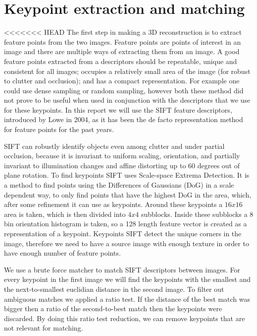 \section{Keypoint extraction and matching}
\label{matching}
<<<<<<< HEAD
The first step in making a 3D reconstruction is to extract feature points from the two images.
Feature points are points of interest in an image and there are multiple ways of extracting them from an image.
A good feature points extracted from a descriptors should be repeatable, unique and consistent for all images;
occupies a relatively small area of the image (for robust to clutter and occlusion); and has a compact representation.
For example one could use dense sampling \cite{DSIFT} or random sampling,
however both these method did not prove to be useful when used in conjunction with the descriptors that we use for these keypoints.
In this report we will use the SIFT feature descriptors, introduced by Lowe\cite{SIFT} in 2004, as it has been the de facto representation method for feature points for the past years.

SIFT can robustly identify objects even among clutter and under partial occlusion, because it is invariant to uniform scaling, orientation, and partially invariant to illumination changes and affine distorting up to 60 degrees out of plane rotation.
To find keypoints SIFT uses Scale-space Extrema Detection.
It is a method to find points using the Differences of Gaussians (DoG) in a scale dependent way, to only find points that have the highest DoG in the area, which, after some refinement it can use as keypoints.
Around these keypoints a $16x16$ area is taken, which is then divided into $4x4$ subblocks.
Inside these subblocks a 8 bin orientation histogram is taken, so a 128 length feature vector is created as a representation of a keypoint.
Keypoints SIFT detect the unique corners in the image, therefore we need to have a source image with enough texture in order to have enough number of feature points.

We use a brute force matcher to match SIFT descriptors between images. 
For every keypoint in the first image we will find the keypoints with the smallest and the next-to-smallest euclidian distance in the second image. 
To filter out ambiguous matches we applied a ratio test. 
If the distance of the best match was bigger then a ratio of the second-to-best match then the keypoints were discarded.
By doing this ratio test reduction, we can remove keypoints that are not relevant for matching.

